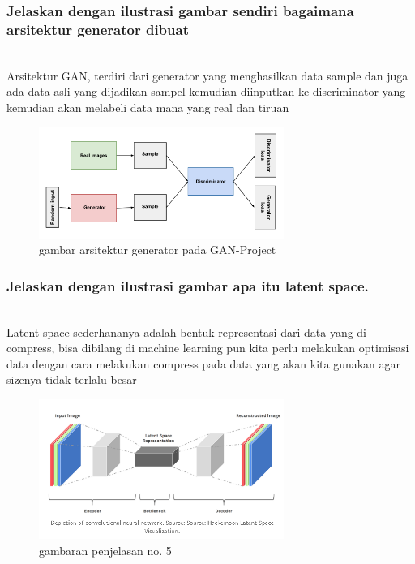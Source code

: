 \subsubsection{Jelaskan dengan ilustrasi gambar sendiri bagaimana arsitektur generator dibuat}
\hfill\\
Arsitektur GAN, terdiri dari generator yang menghasilkan data sample dan juga ada data asli yang dijadikan sampel kemudian diinputkan ke discriminator yang kemudian akan melabeli data mana yang real dan tiruan
\begin{figure}[H]
	\centering
	\includegraphics[width=8cm]{figures/1174070/8/arsitektur_GAN.png}
	\caption{gambar arsitektur generator pada GAN-Project}
\end{figure}

\subsubsection{Jelaskan dengan ilustrasi gambar apa itu latent space.}
\hfill\\
Latent space sederhananya adalah bentuk representasi dari data yang di compress, bisa dibilang di machine learning pun kita perlu melakukan optimisasi data dengan cara melakukan compress pada data yang akan kita gunakan agar sizenya tidak terlalu besar
\begin{figure}[H]
	\centering
	\includegraphics[width=8cm]{figures/1174070/8/latentspace.png}
	\caption{gambaran penjelasan no. 5}
\end{figure}

